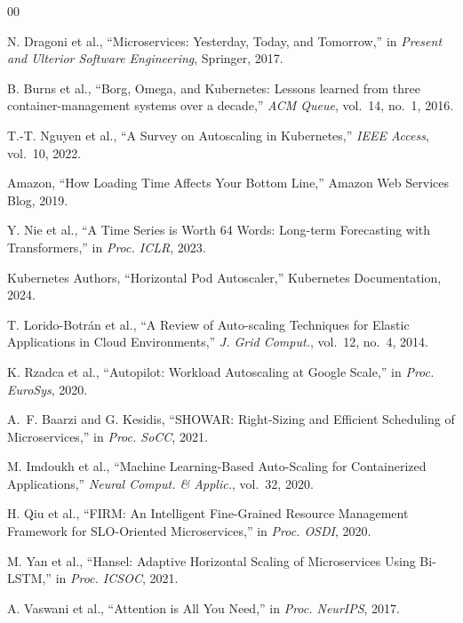 \documentclass[conference]{IEEEtran}
\begin{document}
\begin{thebibliography}{00}

 N. Dragoni et al., ``Microservices: Yesterday, Today, and Tomorrow,'' in \textit{Present and Ulterior Software Engineering}, Springer, 2017.

 B. Burns et al., ``Borg, Omega, and Kubernetes: Lessons learned from three container-management systems over a decade,'' \textit{ACM Queue}, vol.~14, no.~1, 2016.

 T.-T. Nguyen et al., ``A Survey on Autoscaling in Kubernetes,'' \textit{IEEE Access}, vol.~10, 2022.

 Amazon, ``How Loading Time Affects Your Bottom Line,'' Amazon Web Services Blog, 2019.

 Y. Nie et al., ``A Time Series is Worth 64 Words: Long-term Forecasting with Transformers,'' in \textit{Proc. ICLR}, 2023.

 Kubernetes Authors, ``Horizontal Pod Autoscaler,'' Kubernetes Documentation, 2024.

 T. Lorido-Botr\'an et al., ``A Review of Auto-scaling Techniques for Elastic Applications in Cloud Environments,'' \textit{J. Grid Comput.}, vol.~12, no.~4, 2014.

 K. Rzadca et al., ``Autopilot: Workload Autoscaling at Google Scale,'' in \textit{Proc. EuroSys}, 2020.

 A.~F. Baarzi and G. Kesidis, ``SHOWAR: Right-Sizing and Efficient Scheduling of Microservices,'' in \textit{Proc. SoCC}, 2021.

 M. Imdoukh et al., ``Machine Learning-Based Auto-Scaling for Containerized Applications,'' \textit{Neural Comput. \& Applic.}, vol.~32, 2020.

 H. Qiu et al., ``FIRM: An Intelligent Fine-Grained Resource Management Framework for SLO-Oriented Microservices,'' in \textit{Proc. OSDI}, 2020.

 M. Yan et al., ``Hansel: Adaptive Horizontal Scaling of Microservices Using Bi-LSTM,'' in \textit{Proc. ICSOC}, 2021.

 A. Vaswani et al., ``Attention is All You Need,'' in \textit{Proc. NeurIPS}, 2017.


\end{thebibliography}
\end{document}
